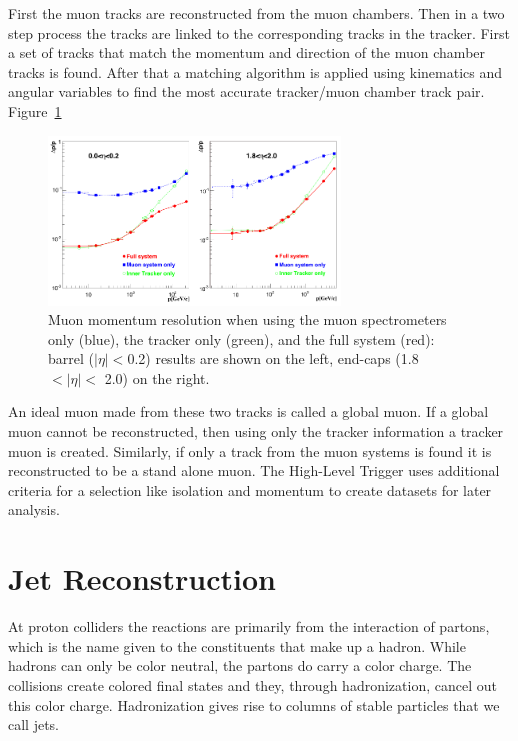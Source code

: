 First the muon tracks are reconstructed from the muon chambers. Then in a two step process the tracks are linked to the corresponding tracks in the tracker.  First a set of tracks that match the momentum and direction of the muon chamber tracks is found.  After that a matching algorithm is applied using kinematics and angular variables to find the most accurate tracker/muon chamber track pair. Figure~\ref{fig:muon_pandolfi}~\cite{Pandolfi_thesis}

\begin{figure}[htb]
\centering
\includegraphics[width=0.69\textwidth]{Reconstruction/muon_Pandolfi.pdf}
\caption{Muon momentum resolution when using the muon spectrometers only (blue), the tracker only (green), and the full system (red): barrel ($|\eta| < $0.2) results are shown on the left, end-caps (1.8 $< |\eta| <$ 2.0) on the right.~\cite{Pandolfi_thesis}}
\label{fig:muon_pandolfi}
\end{figure}

An ideal muon made from these two tracks is called a global muon.  If a global muon cannot be reconstructed, then using only the tracker information a tracker muon is created.  Similarly, if only a track from the muon systems is found it is reconstructed to be a stand alone muon. The High-Level Trigger uses additional criteria for a selection like isolation and momentum to create datasets for later analysis.

\section{Jet Reconstruction}

At proton colliders the reactions are primarily from the interaction of partons, which is the name given to the constituents that make up a hadron.  While hadrons can only be color neutral, the partons do carry a color charge. The collisions create colored final states and they, through hadronization, cancel out this color charge.  Hadronization gives rise to columns of stable particles that we call jets.  

